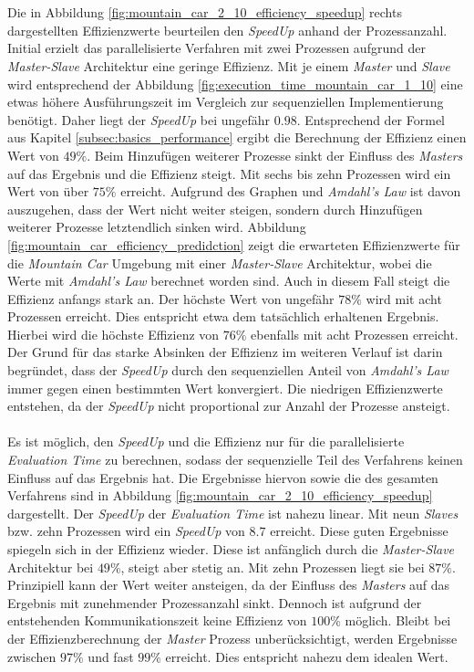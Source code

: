 \\\\
Die in Abbildung \ref{fig:mountain_car_2_10_efficiency_speedup} rechts dargestellten Effizienzwerte beurteilen den \emph{SpeedUp} anhand der Prozessanzahl. Initial erzielt das parallelisierte Verfahren mit zwei Prozessen aufgrund der \emph{Master-Slave} Architektur eine geringe Effizienz. Mit je einem \emph{Master} und \emph{Slave} wird entsprechend der Abbildung \ref{fig:execution_time_mountain_car_1_10} eine etwas höhere Ausführungszeit im Vergleich zur sequenziellen Implementierung benötigt. Daher liegt der \emph{SpeedUp} bei ungefähr $0.98$. Entsprechend der Formel aus Kapitel \ref{subsec:basics_performance} ergibt die Berechnung der Effizienz einen Wert von $49\%$. Beim Hinzufügen weiterer Prozesse sinkt der Einfluss des \emph{Masters} auf das Ergebnis und die Effizienz steigt. Mit sechs bis zehn Prozessen wird ein Wert von über $75\%$ erreicht. Aufgrund des Graphen und \emph{Amdahl's Law} ist davon auszugehen, dass der Wert nicht weiter steigen, sondern durch Hinzufügen weiterer Prozesse letztendlich sinken wird. Abbildung \ref{fig:mountain_car_efficiency_predidction} zeigt die erwarteten Effizienzwerte für die \emph{Mountain Car} Umgebung mit einer \emph{Master-Slave} Architektur, wobei die Werte mit \emph{Amdahl's Law} berechnet worden sind. Auch in diesem Fall steigt die Effizienz anfangs stark an. Der höchste Wert von ungefähr $78\%$ wird mit acht Prozessen erreicht. Dies entspricht etwa dem tatsächlich erhaltenen Ergebnis. Hierbei wird die höchste Effizienz von $76\%$ ebenfalls mit acht Prozessen erreicht. Der Grund für das starke Absinken der Effizienz im weiteren Verlauf ist darin begründet, dass der \emph{SpeedUp} durch den sequenziellen Anteil von \emph{Amdahl's Law} immer gegen einen bestimmten Wert konvergiert. Die niedrigen Effizienzwerte entstehen, da der \emph{SpeedUp} nicht proportional zur Anzahl der Prozesse ansteigt.
\\\\
Es ist möglich, den \emph{SpeedUp} und die Effizienz nur für die parallelisierte \emph{Evaluation Time} zu berechnen, sodass der sequenzielle Teil des Verfahrens keinen Einfluss auf das Ergebnis hat. Die Ergebnisse hiervon sowie die des gesamten Verfahrens sind in Abbildung \ref{fig:mountain_car_2_10_efficiency_speedup} dargestellt. Der \emph{SpeedUp} der \emph{Evaluation Time} ist nahezu linear. Mit neun \emph{Slaves} bzw. zehn Prozessen wird ein \emph{SpeedUp} von $8.7$ erreicht. Diese guten Ergebnisse spiegeln sich in der Effizienz wieder. Diese ist anfänglich durch die \emph{Master-Slave} Architektur bei $49\%$, steigt aber stetig an. Mit zehn Prozessen liegt sie bei $87\%$. Prinzipiell kann der Wert weiter ansteigen, da der Einfluss des \emph{Masters} auf das Ergebnis mit zunehmender Prozessanzahl sinkt. Dennoch ist aufgrund der entstehenden Kommunikationszeit keine Effizienz von $100\%$ möglich. Bleibt bei der Effizienzberechnung der \emph{Master} Prozess unberücksichtigt, werden Ergebnisse zwischen $97\%$ und fast $99\%$ erreicht. Dies entspricht nahezu dem idealen Wert.

